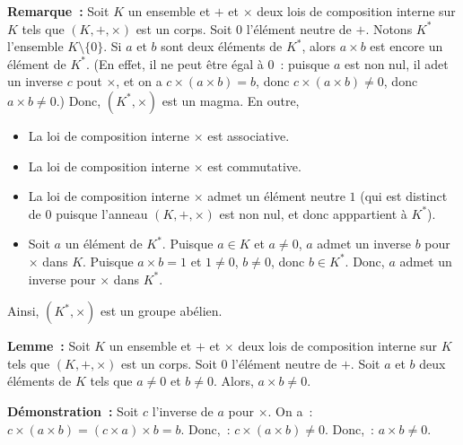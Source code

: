 \noindent\textbf{Remarque :} Soit $K$ un ensemble et $+$ et $\times$ deux lois de composition interne sur $K$ tels que $(K, +, \times)$ est un corps. 
    Soit $0$ l'élément neutre de $+$.
    Notons $K^*$ l'ensemble $K \setminus \lbrace 0 \rbrace$.
    Si $a$ et $b$ sont deux éléments de $K^*$, alors $a \times b$ est encore un élément de $K^*$. 
    (En effet, il ne peut être égal à $0$ : puisque $a$ est non nul, il adet un inverse $c$ pout $\times$, et on a $c \times (a \times b) = b$, donc $c \times (a \times b) \neq 0$, donc $a \times b \neq 0$.)
    Donc, $(K^*, \times)$ est un magma.
    En outre, 
    \begin{itemize}[nosep]
        \item La loi de composition interne $\times$ est associative.
        \item La loi de composition interne $\times$ est commutative.
        \item La loi de composition interne $\times$ admet un élément neutre $1$ (qui est distinct de $0$ puisque l'anneau $(K, +, \times)$ est non nul, et donc apppartient à $K^*$).
        \item Soit $a$ un élément de $K^*$. 
            Puisque $a \in K$ et $a \neq 0$, $a$ admet un inverse $b$ pour $\times$ dans $K$.
            Puisque $a \times b = 1$ et $1 \neq 0$, $b \neq 0$, donc $b \in K^*$.
            Donc, $a$ admet un inverse pour $\times$ dans $K^*$.
    \end{itemize}
    Ainsi, $(K^*, \times)$ est un groupe abélien.

\medskip

\noindent\textbf{Lemme :} Soit $K$ un ensemble et $+$ et $\times$ deux lois de composition interne sur $K$ tels que $(K, +, \times)$ est un corps. 
    Soit $0$ l'élément neutre de $+$.
    Soit $a$ et $b$ deux éléments de $K$ tels que $a \neq 0$ et $b \neq 0$.
    Alors, $a \times b \neq 0$.

\medskip

\noindent\textbf{Démonstration :} Soit $c$ l'inverse de $a$ pour $\times$.
    On a : $c \times (a \times b) = (c \times a) \times b = b$.
    Donc, : $c \times (a \times b) \neq 0$.
    Donc, : $a \times b \neq 0$.

    \done
